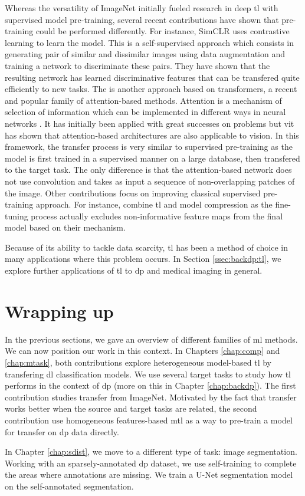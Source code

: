 Whereas the versatility of ImageNet initially fueled research in deep \acrlong{tl} with supervised model pre-training, several recent contributions have shown that pre-training could be performed differently. For instance, SimCLR \parencite{chen2020simple} uses contrastive learning to learn the model. This is a self-supervised approach which consists in generating pair of similar and dissimilar images using data augmentation and training a network to discriminate these pairs. They have shown that the resulting network has learned discriminative features that can be transfered quite efficiently to new tasks. The  \parencite{dosovitskiy2020image} is another approach based on transformers, a recent and popular family of attention-based methods. Attention is a mechanism of selection of information which can be implemented in different ways in neural networks \parencite{niu2021review}. It has initially been applied with great successes on  problems but \acrshort{vit} has shown that attention-based architectures are also applicable to vision. In this framework, the transfer process is very similar to supervised pre-training as the model is first trained in a supervised manner on a large database, then transfered to the target task. The only difference is that the attention-based network does not use convolution and takes as input a sequence of non-overlapping patches of the image. Other contributions focus on improving classical supervised pre-training approach. For instance, \parencite{wang2019pay} combine \acrlong{tl} and model compression as the fine-tuning process actually excludes non-informative feature maps from the final model based on their  mechanism.

Because of its ability to tackle data scarcity, \acrlong{tl} has been a method of choice in many applications where this problem occurs. In Section \ref{ssec:backdp:tl}, we explore further applications of \acrlong{tl} to \acrlong{dp} and medical imaging in general.

\section{Wrapping up}

In the previous sections, we gave an overview of different families of \acrlong{ml} methods. We can now position our work in this context. In Chapters \ref{chap:comp} and \ref{chap:mtask}, both contributions explore heterogeneous model-based \acrlong{tl} by transfering \acrlong{dl} classification models. We use several target tasks to study how \acrlong{tl} performs in the context of \acrlong{dp} (more on this in Chapter \ref{chap:backdp}). The first contribution studies transfer from ImageNet. Motivated by the fact that transfer works better when the source and target tasks are related, the second contribution use homogeneous features-based \acrlong{mtl} as a way to pre-train a model for transfer on \acrlong{dp} data directly.

In Chapter \ref{chap:sdist}, we move to a different type of task: image segmentation. Working with an sparsely-annotated \acrlong{dp} dataset, we use self-training to complete the areas where annotations are missing. We train a U-Net segmentation model on the self-annotated segmentation.
